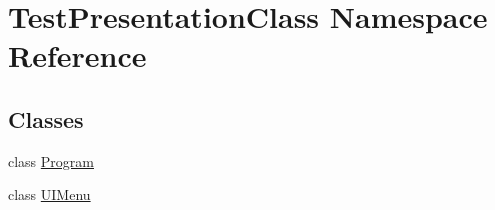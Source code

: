 \hypertarget{namespace_test_presentation_class}{}\section{Test\+Presentation\+Class Namespace Reference}
\label{namespace_test_presentation_class}
\subsection*{Classes}
\begin{DoxyCompactItemize}
\item 
class \hyperlink{class_test_presentation_class_1_1_program}{Program}
\item 
class \hyperlink{class_test_presentation_class_1_1_u_i_menu}{U\+I\+Menu}
\end{DoxyCompactItemize}
